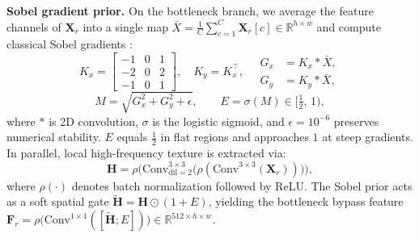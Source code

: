 \documentclass[journal]{IEEEtran}
\newcommand{\R}{\mathbb{R}}
\newcommand{\vect}[1]{\bm{#1}}
\begin{document}
\textbf{Sobel gradient prior.} On the bottleneck branch, we average the feature channels of $\vect{X}_r$ into a single map $\bar{X}=\frac{1}{C}\sum_{c=1}^{C}\vect{X}_r[c]\in\R^{h\times w}$ and compute classical Sobel gradients \cite{sobel1990isotropic}:
\begin{equation}
  K_x=\begin{bmatrix}-1&0&1\\-2&0&2\\-1&0&1\end{bmatrix},\quad K_y=K_x^{\top},\quad
  \begin{aligned} G_x &= K_x * \bar{X},\\ G_y &= K_y * \bar{X},\end{aligned}
  \label{eq:sobel}
\end{equation}
\begin{equation}
  M = \sqrt{G_x^{2}+G_y^{2}+\epsilon},\qquad E=\sigma(M)\in\big[\tfrac12,\,1\big),
  \label{eq:edge}
\end{equation}
where $*$ is 2D convolution, $\sigma$ is the logistic sigmoid, and $\epsilon=10^{-6}$ preserves numerical stability. $E$ equals $\tfrac12$ in flat regions and approaches $1$ at steep gradients. In parallel, local high-frequency texture is extracted via:
\begin{equation}
  \vect{H}=\rho\big(\mathrm{Conv}^{3\times3}_{\text{dil}=2}\big(\rho(\mathrm{Conv}^{3\times3}(\vect{X}_r))\big)\big),
  \label{eq:hf}
\end{equation}
where $\rho(\cdot)$ denotes batch normalization followed by ReLU. The Sobel prior acts as a soft spatial gate $\tilde{\vect{H}} = \vect{H}\odot(1+E)$, yielding the bottleneck bypass feature $\vect{F}_r = \rho\big(\mathrm{Conv}^{1\times1}([\tilde{\vect{H}};E])\big)\in\R^{512\times h\times w}$.
\end{document}
